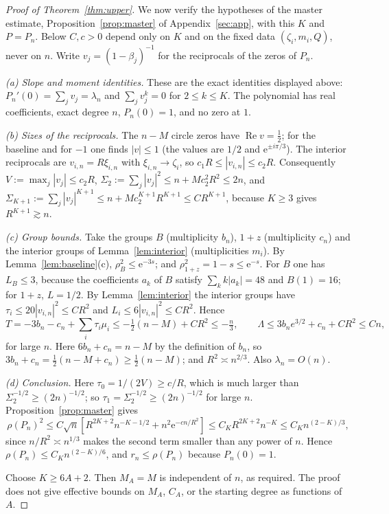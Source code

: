 \documentclass[11pt]{article}
\theoremstyle{remark}\newtheorem{remark}[theorem]{Remark}
\newcommand{\Rea}{\operatorname{Re}}
\newcommand{\ee}{\mathrm e}
\begin{document}
\begin{proof}[Proof of Theorem~\ref{thm:upper}]
We now verify the hypotheses of the master estimate,
Proposition~\ref{prop:master} of Appendix~\ref{sec:app}, with this
\(K\) and \(P=P_n\). Below \(C,c>0\) depend only on \(K\) and on the
fixed data \((\zeta_i,m_i,Q)\), never on \(n\). Write \(v_j=(1-\beta_j)^{-1}\)
for the reciprocals of the zeros of \(P_n\).

\emph{(a) Slope and moment identities.}
These are the exact identities displayed above:
\(P_n'(0)=\sum_jv_j=\lambda_n\) and \(\sum_jv_j^k=0\) for
\(2\le k\le K\). The polynomial has real coefficients, exact degree
\(n\), \(P_n(0)=1\), and no zero at \(1\).

\emph{(b) Sizes of the reciprocals.}
The \(n-M\) circle zeros have \(\Rea v=\tfrac12\); for the baseline and
for \(-1\) one finds \(|v|\le1\) (the values are \(1/2\) and
\(\ee^{\pm i\pi/3}\)). The interior reciprocals are
\(v_{i,n}=R\xi_{i,n}\) with \(\xi_{i,n}\to\zeta_i\), so
\(c_1R\le|v_{i,n}|\le c_2R\). Consequently
\(V:=\max_j|v_j|\le c_2R\),
\(\Sigma_2:=\sum_j|v_j|^2\le n+Mc_2^2R^2\le2n\), and
\(\Sigma_{K+1}:=\sum_j|v_j|^{K+1}\le n+Mc_2^{K+1}R^{K+1}\le CR^{K+1}\),
because \(K\ge3\) gives \(R^{K+1}\gtrsim n\).

\emph{(c) Group bounds.}
Take the groups \(B\) (multiplicity \(b_n\)), \(1+z\) (multiplicity
\(c_n\)) and the interior groups of Lemma~\ref{lem:interior}
(multiplicities \(m_i\)). By Lemma~\ref{lem:baseline}(c),
\(\rho_B^2\le\ee^{-3s}\); and \(\rho_{1+z}^2=1-s\le\ee^{-s}\). For
\(B\) one has \(L_B\le3\), because the coefficients \(a_k\) of \(B\)
satisfy \(\sum_kk|a_k|=48\) and \(B(1)=16\); for \(1+z\), \(L=1/2\).
By Lemma~\ref{lem:interior} the interior groups have
\(\tau_i\le20|v_{i,n}|^2\le CR^2\) and \(L_i\le6|v_{i,n}|^2\le CR^2\).
Hence
\[
 T=-3b_n-c_n+\sum_i\tau_i\mu_i
 \le-\tfrac12(n-M)+CR^2\le-\tfrac n3,
 \qquad
 \Lambda\le 3b_ne^{3/2}+c_n+CR^2\le Cn,
\]
for large \(n\). Here \(6b_n+c_n=n-M\) by the definition of \(b_n\), so
\(3b_n+c_n=\tfrac12(n-M+c_n)\ge\tfrac12(n-M)\); and
\(R^2\asymp n^{2/3}\). Also \(\lambda_n=O(n)\).

\emph{(d) Conclusion.}
Here \(\tau_0=1/(2V)\ge c/R\), which is much larger than
\(\Sigma_2^{-1/2}\ge(2n)^{-1/2}\); so \(\tau_1=\Sigma_2^{-1/2}\ge(2n)^{-1/2}\)
for large \(n\). Proposition~\ref{prop:master} gives
\[
 \rho(P_n)^2\le C\sqrt n\left[R^{2K+2}n^{-K-1/2}
 +n^2\ee^{-cn/R^2}\right]
 \le C_KR^{2K+2}n^{-K}\le C_Kn^{(2-K)/3},
\]
since \(n/R^2\asymp n^{1/3}\) makes the second term smaller than any
power of \(n\). Hence
\(\rho(P_n)\le C_Kn^{(2-K)/6}\), and \(r_n\le\rho(P_n)\) because
\(P_n(0)=1\).

Choose \(K\ge6A+2\). Then \(M_A=M\) is independent of \(n\),
as required. The proof does not give effective bounds on \(M_A\),
\(C_A\), or the starting degree as functions of \(A\).
\end{proof}
\end{document}
